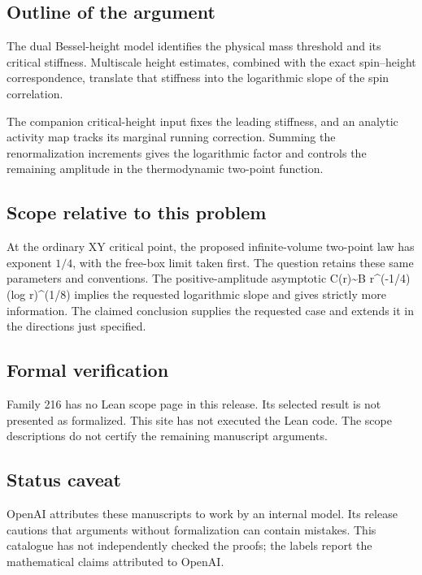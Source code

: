 \documentclass[11pt]{article}
\begin{document}
\subsection{Outline of the argument}
The dual Bessel-height model identifies the physical mass threshold and its critical stiffness. Multiscale height estimates, combined with the exact spin--height correspondence, translate that stiffness into the logarithmic slope of the spin correlation.

The companion critical-height input fixes the leading stiffness, and an analytic activity map tracks its marginal running correction. Summing the renormalization increments gives the logarithmic factor and controls the remaining amplitude in the thermodynamic two-point function.

\subsection{Scope relative to this problem}
At the ordinary XY critical point, the proposed infinite-volume two-point law has exponent $1/4$, with the free-box limit taken first. The question retains these same parameters and conventions. The positive-amplitude asymptotic C(r)\textasciitilde{}B r\textasciicircum{}(-1/4)(log r)\textasciicircum{}(1/8) implies the requested logarithmic slope and gives strictly more information. The claimed conclusion supplies the requested case and extends it in the directions just specified.

\subsection{Formal verification}
Family 216 has no Lean scope page in this release. Its selected result is not presented as formalized. This site has not executed the Lean code. The scope descriptions do not certify the remaining manuscript arguments.

\subsection{Status caveat}
OpenAI attributes these manuscripts to work by an internal model. Its release cautions that arguments without formalization can contain mistakes. This catalogue has not independently checked the proofs; the labels report the mathematical claims attributed to OpenAI.
\end{document}
